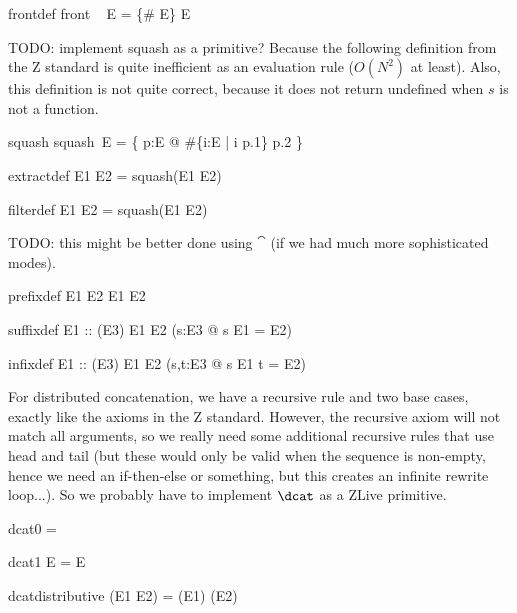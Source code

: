 \documentclass{article}
\begin{document}
\begin{zedrule}{frontdef}
   front ~ E = \{\# E\} \ndres E
\end{zedrule}

TODO: implement squash as a primitive?
Because the following definition from the Z standard is quite 
inefficient as an evaluation rule ($O(N^2)$ at least).  
Also, this definition is not quite correct, because it does
not return undefined when $s$ is not a function.
\begin{zedrule}{squash}
   squash~E = \{ p:E @ \#\{i:\dom E | i \leq p.1\} \mapsto p.2 \}
\end{zedrule}

\begin{zedrule}{extractdef}
   E1 \extract E2 = squash(E1 \dres E2)
\end{zedrule}

\begin{zedrule}{filterdef}
   E1 \filter E2 = squash(E1 \rres E2)
\end{zedrule}

TODO: this might be better done using $\cat$
(if we had much more sophisticated modes).
\begin{zedrule}{prefixdef}
   E1 \prefix E2 \iff E1 \subseteq E2
\end{zedrule}

\begin{zedrule}{suffixdef}
   E1 :: \power (\arithmos \cross E3)
\derives
   E1 \suffix E2 \iff (\exists s:\seq E3 @ s \cat E1 = E2)
\end{zedrule}

\begin{zedrule}{infixdef}
   E1 :: \power (\arithmos \cross E3)
\derives
   E1 \infix E2 \iff (\exists s,t:\seq E3 @ s \cat E1 \cat t = E2)
\end{zedrule}

For distributed concatenation, we have a recursive rule and
two base cases, exactly like the axioms in the Z standard.
However, the recursive axiom will not match all arguments,
so we really need some additional recursive rules that use 
head and tail (but these would only be valid when the sequence
is non-empty, hence we need an if-then-else or something, but this
creates an infinite rewrite loop...).  So we probably have to
implement $\dcat$ as a ZLive primitive. 
\begin{zedrule}{dcat0}
   \dcat \langle \rangle = \langle \rangle
\end{zedrule}
\begin{zedrule}{dcat1}
   \dcat \langle E \rangle = E
\end{zedrule}
\begin{zedrule}{dcatdistributive}
   \dcat (E1 \cat E2) = (\dcat E1) \cat (\dcat E2)
\end{zedrule}

\end{document}
